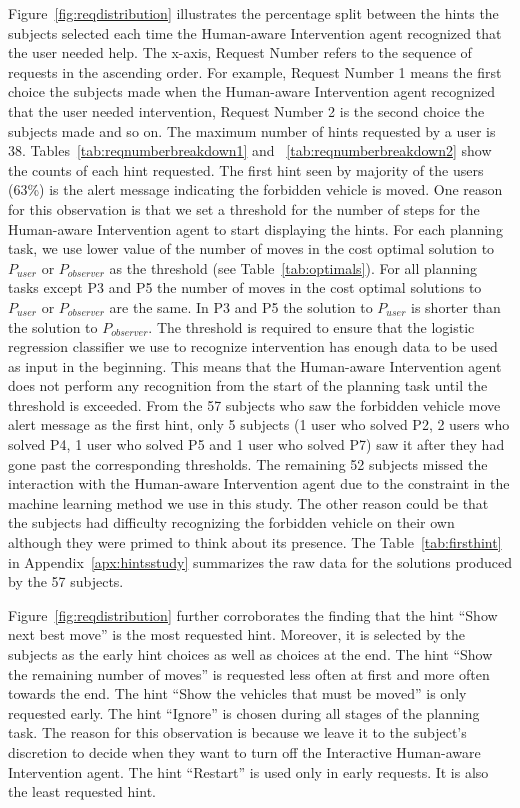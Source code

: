 Figure~\ref{fig:reqdistribution} illustrates the percentage split between the hints the subjects selected each time the Human-aware Intervention agent recognized that the user needed help.
The x-axis, Request Number refers to the sequence of requests in the ascending order. 
For example, Request Number 1 means the first choice the subjects made when the Human-aware Intervention agent recognized that the user needed intervention, Request Number 2 is the second choice the subjects made and so on.
The maximum number of hints requested by a user is 38.
Tables~\ref{tab:reqnumberbreakdown1} and ~\ref{tab:reqnumberbreakdown2} show the counts of  each hint requested.
The first hint seen by majority of the users (63\%) is the alert message indicating the forbidden vehicle is moved.
One reason for this observation is that we set a threshold for the number of steps for the Human-aware Intervention agent to start displaying the hints.
For each planning task, we use lower value of the number of moves in the cost optimal solution to $P_{user}$ or $P_{observer}$ as the threshold (see Table~\ref{tab:optimals}).
For all planning tasks except P3 and P5 the number of moves in the cost optimal solutions to $P_{user}$ or $P_{observer}$ are the same.
In P3 and P5 the solution to $P_{user}$ is shorter than the solution to $P_{observer}$.
The threshold is required to ensure that the logistic regression classifier we use to recognize intervention has enough data to be used as input in the beginning.
This means that the Human-aware Intervention agent does not perform any recognition  from the start of the planning task until the threshold is exceeded.
From the 57 subjects who saw the forbidden vehicle move alert message as the first hint, only 5 subjects (1 user who solved P2, 2 users who solved P4, 1 user who solved P5 and 1 user who solved P7) saw it after they had gone past the corresponding thresholds.
The remaining 52 subjects missed the interaction with the Human-aware Intervention agent due to the constraint in the machine learning method we use in this study.
The other reason could be that the subjects had difficulty recognizing the forbidden vehicle on their own although they were primed to think about its presence. 
The Table~\ref{tab:firsthint} in Appendix~\ref{apx:hintsstudy} summarizes the raw data for the solutions produced by the 57 subjects.

Figure~\ref{fig:reqdistribution} further corroborates the finding that the hint ``Show next best move'' is the most requested hint.
Moreover, it is selected by the subjects as the early hint choices as well as choices at the end.
The hint ``Show the remaining number of moves'' is requested less often at first and more often towards the end.
The hint ``Show the vehicles that must be moved'' is only requested early.
The hint ``Ignore'' is chosen during all stages of the planning task.
The reason for this observation is because we leave it to the subject's discretion to decide when they want to turn off the Interactive Human-aware Intervention agent.
The hint ``Restart'' is used only in early requests.
It is also the least requested hint.

